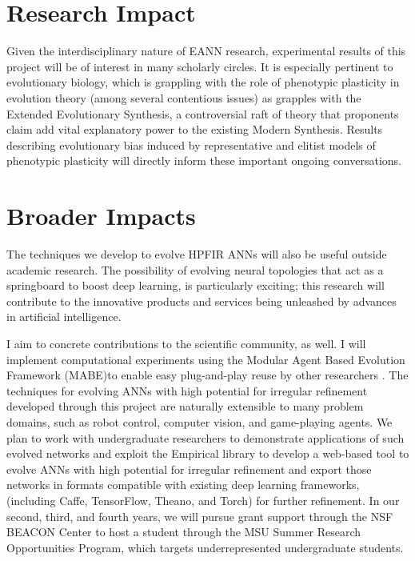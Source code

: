 \section{Research Impact}

Given the interdisciplinary nature of EANN research, experimental results of this project will be of interest in many scholarly circles.
It is especially pertinent to evolutionary biology, which is grappling with the role of phenotypic plasticity in evolution theory (among several contentious issues) as grapples with the Extended Evolutionary Synthesis, a controversial raft of theory that proponents claim add vital explanatory power to the existing Modern Synthesis.\autocite{Pigliucci2008IsEvolvable, Laland2014DoesRethink}
Results describing evolutionary bias induced by representative and elitist models of phenotypic plasticity will directly inform these important ongoing conversations.

\section{Broader Impacts}

The techniques we develop to evolve HPFIR ANNs will also be useful outside academic research.
The possibility of evolving neural topologies that act as a springboard to boost deep learning, is particularly exciting; this research will contribute to the innovative products and services being unleashed by advances in artificial intelligence.

I aim to  concrete contributions to the scientific community, as well.
I will implement computational experiments using the Modular Agent Based Evolution Framework (MABE)to enable easy plug-and-play reuse by other researchers \autocite{Hintze2017Mabe}.
The techniques for evolving ANNs with high potential for irregular refinement developed through this project are naturally extensible to many problem domains, such as robot control, computer vision, and game-playing agents.
We plan to work with undergraduate researchers to demonstrate applications of such evolved networks and exploit the Empirical library to develop a web-based tool to evolve ANNs with high potential for irregular refinement and export those networks in formats compatible with existing deep learning frameworks, (including Caffe, TensorFlow, Theano, and Torch) for further refinement.
In our second, third, and fourth years, we will pursue grant support through the NSF BEACON Center to host a student through the MSU Summer Research Opportunities Program, which targets underrepresented undergraduate students.
